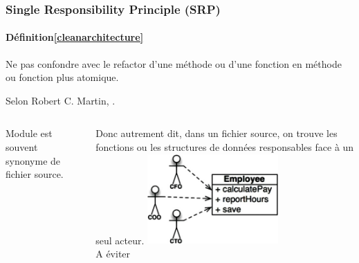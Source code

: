 \documentclass{beamer}
\begin{document}
    \begin{frame}
        \transdissolve
        \frametitle{Single Responsibility Principle (SRP)}
        \framesubtitle{Définition\cref{cleanarchitecture}}
        \begin{dangercolorbox}
            Ne pas confondre avec le refactor d'une méthode ou d'une fonction en méthode ou fonction plus atomique.
        \end{dangercolorbox}
        Selon Robert C. Martin, .
        \begin{columns}
            Module est souvent synonyme de fichier source.

            Donc autrement dit, dans un fichier source, on trouve les fonctions ou les structures de données responsables face à un seul acteur.
            \centering
            \includegraphics[width=5cm]{image/s-to-avoid} \\ A éviter \\
        \end{columns}
    \end{frame}
\end{document}
